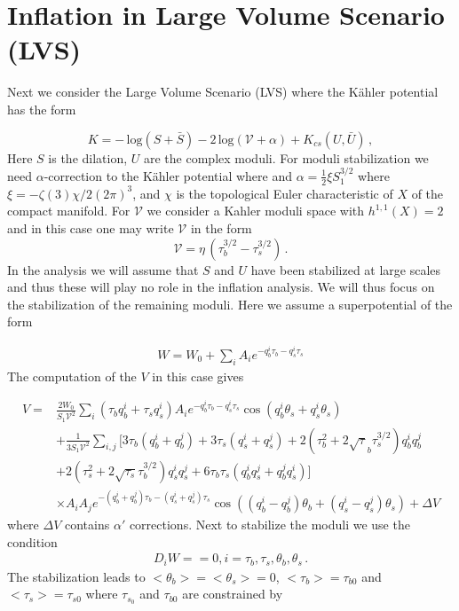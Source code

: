 \documentclass[12pt]{article}
\begin{document}
\section{Inflation in Large Volume Scenario (LVS) \label{sec:LVS}}

Next we consider the Large Volume Scenario (LVS) \cite{Balasubramanian:2005zx}
where the K\"ahler potential has the form

\begin{equation}
  K = - \, \text{log} (S+ \bar{S}) -2 \, \text{log} (\mathcal{V} +\alpha)
  + K_{cs} (U, \bar{U})  \, ,
\end{equation}
Here $S$ is the dilation, $U$ are the complex moduli. For moduli stabilization we need $\alpha$-correction to the K\"ahler potential where
and $\alpha = \frac{1}{2} \xi S_1^{3/2}$ where $\xi = -\zeta (3) \chi/2 (2\pi)^3$, and $\chi$ is the topological Euler characteristic of $X$ of the compact manifold. For $\mathcal{V}$ we consider a Kahler moduli space
with $h^{1,1}(X)=2$ and in this case one may write $\mathcal{V}$ in the form
\begin{equation}
  \mathcal{V} = \eta \,( \tau_b^{3/2} - \tau_s^{3/2}) \, .
\end{equation}
In the analysis we will assume that $S$ and $U$ have been stabilized at large scales and thus these will play no role in the
inflation analysis. We will thus focus on the stabilization of the remaining moduli. Here we assume a superpotential of the form

\begin{align}
  W= W_0 +\sum_i A_i e^{-q^i_b \tau_b -q^i_s \tau_s}
\end{align}
The computation of the $V$ in this case gives


\begin{align}
  V= & \frac{2 W_0}{S_1 \mathcal{V}^2} \sum_i (\tau_b q_b^i +\tau_s q_s^i) A_i e^{- q_b^i \tau_b - q_s^i \tau_s} \cos(q_b^i \theta_s + q^i_s \theta_s) \nonumber\\
     & + \frac{1}{3 S_1\mathcal{V}^2} \sum_{i,j} \Big[3 \tau_b (q^i_b +q^j_b)
    + 3\tau_s (q_s^i +q_s^j)
    + 2 (\tau_b^2 + 2 \sqrt \tau_b \tau_s^{3/2}) q_b^i q_b^j \nonumber\\
     & + 2(\tau^2_s+2 \sqrt{\tau_s} \tau^{3/2}_b) q_s^i q_s^j + 6 \tau_b \tau_s (q_b^i q_s^j + q_b^j q_s^i) \big]\nonumber\\
     & \times
  A_i A_j e^{ -(q_b^i + q_b^j) \tau_b - (q_s^i + q_s^j)\tau_s} \cos\left((q_b^i -q_b^j)\theta_b + (q_s^i -q_s^j)\theta_s\right) + \Delta V
\end{align}
where $\Delta V$ contains $\alpha'$ corrections. Next to stabilize the moduli we use the condition
\begin{align}
  D_i W==0, i= \tau_b, \tau_s, \theta_b, \theta_s\,.
\end{align}
The stabilization leads to $<\theta_b>=<\theta_s>=0$, $<\tau_b>=\tau_{b0}$ and $<\tau_{s}>= \tau_{s0}$ where
$\tau_{s_0}$ and $\tau_{b0}$ are constrained by
\end{document}
